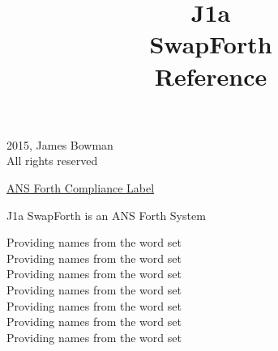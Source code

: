 %
%



\title{\LARGE \bf
J1a\\
SwapForth \\
Reference
}



\maketitle

\begingroup
\footnotesize
\parindent 0pt
\parskip \baselineskip
\textcopyright{} 2015, James Bowman \\
All rights reserved

\begin{framed}

\underline{ANS Forth Compliance Label}

J1a SwapForth is an ANS Forth System

Providing names from the  word set \\
Providing names from the  word set \\
Providing names from the  word set \\
Providing names from the  word set \\
Providing names from the  word set \\
Providing names from the  word set \\
Providing names from the  word set

\end{framed}

